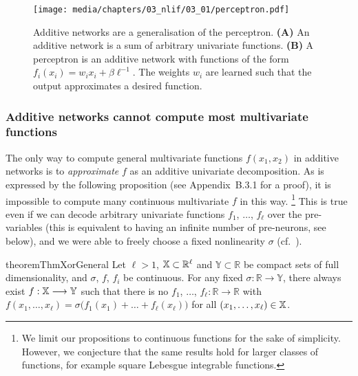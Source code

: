 \begin{figure}
	\centering
	\texttt{[image: media/chapters/03\_nlif/03\_01/perceptron.pdf]}%
	{\label{fig:perceptron_a}}%
	{\label{fig:perceptron_b}}%
	\caption[Additive networks are a generalisation of the perceptron]{Additive networks are a generalisation of the perceptron. \textbf{(A)} An additive network is a sum of arbitrary univariate functions. \textbf{(B)} A perceptron is an additive network with functions of the form $f_i(x_i) = w_i x_i + \beta \ell^{-1}$. The weights $w_i$ are learned such that the output approximates a desired function.}
\end{figure}

\subsubsection{Additive networks cannot compute most multivariate functions}
The only way to compute general multivariate functions $f(x_1, x_2)$ in additive networks is to \emph{approximate} $f$ as an additive univariate decomposition.
As is expressed by the following proposition (see Appendix~B.3.1 for a proof), it is impossible to compute many continuous multivariate $f$ in this way.%
\footnote{We limit our propositions to continuous functions for the sake of simplicity.
However, we conjecture that the same results hold for larger classes of functions, for example square Lebesgue integrable functions.}
This is true even if we can decode arbitrary univariate functions $f_1$, $\ldots$, $f_\ell$ over the pre-variables (this is equivalent to having an infinite number of pre-neurons, see below), and we were able to freely choose a fixed nonlinearity $\sigma$ (cf.~).

\begin{restatable}{theorem}{ThmXorGeneral}
\label{thm:xor_general}
Let $\ell > 1$, $\mathbb{X} \subset \mathbb{R}^\ell$ and $\mathbb{Y} \subset \mathbb{R}$ be compact sets of full dimensionality, and $\sigma$, $f$, $f_i$ be continuous.
For any fixed $\sigma : \mathbb{R} \longrightarrow \mathbb{Y}$, there always exist $f : \mathbb{X} \longrightarrow \mathbb{Y}$ such that there is no $f_1$, $\ldots$, $f_\ell : \mathbb{R}  \longrightarrow \mathbb{R}$ with
$f(x_1, \ldots, x_\ell) = \sigma\bigl( f_1(x_1) + \ldots + f_\ell(x_\ell) \bigr)$ for all $(x_1, \ldots, x_\ell) \in \mathbb{X}$.
\end{restatable}

